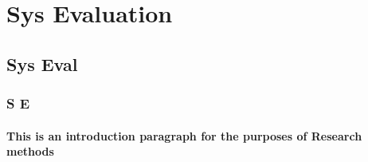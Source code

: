 \section{Sys Evaluation}
\subsection{Sys Eval}
\subsubsection{S E}
\paragraph{This is an introduction paragraph for the purposes of Research methods}